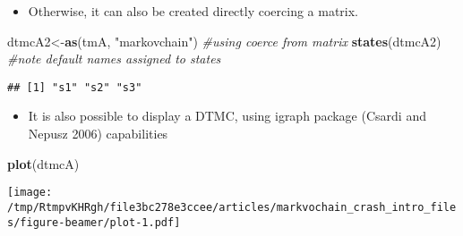 \documentclass[ignorenonframetext,]{beamer}
\newenvironment{Shaded}{\begin{snugshade}}{\end{snugshade}}
\newcommand{\CommentTok}[1]{\textcolor[rgb]{0.56,0.35,0.01}{\textit{#1}}}
\newcommand{\KeywordTok}[1]{\textcolor[rgb]{0.13,0.29,0.53}{\textbf{#1}}}
\newcommand{\NormalTok}[1]{#1}
\newcommand{\StringTok}[1]{\textcolor[rgb]{0.31,0.60,0.02}{#1}}
\providecommand{\tightlist}{%
  \setlength{\itemsep}{0pt}\setlength{\parskip}{0pt}}
\providecommand{\tightlist}{
  \setlength{\itemsep}{0pt}\setlength{\parskip}{0pt}
}
\begin{document}
\begin{frame}[fragile]

\begin{itemize}
\tightlist
\item
  Otherwise, it can also be created directly coercing a matrix.
\end{itemize}

\begin{Shaded}
\begin{Highlighting}[]
\NormalTok{dtmcA2<-}\KeywordTok{as}\NormalTok{(tmA, }\StringTok{"markovchain"}\NormalTok{) }\CommentTok{#using coerce from matrix}
\KeywordTok{states}\NormalTok{(dtmcA2) }\CommentTok{#note default names assigned to states}
\end{Highlighting}
\end{Shaded}

\begin{verbatim}
## [1] "s1" "s2" "s3"
\end{verbatim}

\end{frame}

\begin{frame}[fragile]

\begin{itemize}
\tightlist
\item
  It is also possible to display a DTMC, using igraph package (Csardi
  and Nepusz 2006) capabilities
\end{itemize}

\begin{Shaded}
\begin{Highlighting}[]
\KeywordTok{plot}\NormalTok{(dtmcA)}
\end{Highlighting}
\end{Shaded}

\texttt{[image: /tmp/RtmpvKHRgh/file3bc278e3ccee/articles/markvochain\_crash\_intro\_files/figure-beamer/plot-1.pdf]}

\end{frame}
\end{document}
